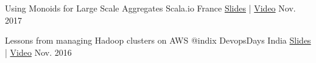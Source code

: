 \begin{cvhonors}

  \cvhonor
    {Using Monoids for Large Scale Aggregates} %
    {Scala.io France} %
    {\href{https://speakerdeck.com/ashwanthkumar/using-monoids-for-large-scale-aggregates}{Slides} | \href{https://www.youtube.com/watch?v=UW3Z_rIPn3w}{Video}} %
    {Nov. 2017} %

  \cvhonor
    {Lessons from managing Hadoop clusters on AWS @indix} %
    {DevopsDays India} %
    {\href{http://bit.ly/autoscaling-on-aws}{Slides} | \href{https://www.youtube.com/watch?v=eBbgylpRufQ}{Video}} %
    {Nov. 2016} %

\end{cvhonors}
